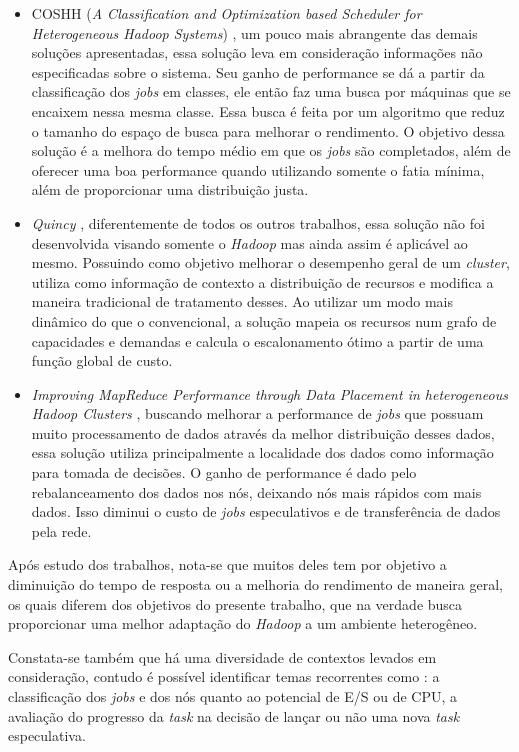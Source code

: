 \begin{itemize}
\item COSHH (\emph{A Classification and Optimization based Scheduler for Heterogeneous Hadoop Systems}) \cite{COSHH}, um pouco mais abrangente das demais soluções apresentadas, essa solução leva em consideração informações não especificadas sobre o sistema. Seu ganho de performance se dá a partir da classificação dos \emph{jobs} em classes, ele então faz uma busca por máquinas que se encaixem nessa mesma classe. Essa busca é feita por um algoritmo que reduz o tamanho do espaço de busca para melhorar o rendimento. O objetivo dessa solução é a melhora do tempo médio em que os \emph{jobs} são completados, além de oferecer uma boa performance quando utilizando somente o fatia mínima, além de proporcionar uma distribuição justa.

\item \emph{Quincy} \cite{Quincy}, diferentemente de todos os outros trabalhos, essa solução não foi desenvolvida visando somente o \emph{Hadoop} mas ainda assim é aplicável ao mesmo. Possuindo como objetivo melhorar o desempenho geral de um \emph{cluster}, utiliza como informação de contexto a distribuição de recursos e modifica a maneira tradicional de tratamento desses. Ao utilizar um modo mais dinâmico do que o convencional, a solução mapeia os recursos num grafo de capacidades e demandas e calcula o escalonamento ótimo a partir de uma função global de custo.

\item \emph{Improving MapReduce Performance through Data Placement in heterogeneous Hadoop Clusters} \cite{IMRPDPHHC}, buscando melhorar a performance de \emph{jobs} que possuam muito processamento de dados através da melhor distribuição desses dados, essa solução utiliza principalmente a localidade dos dados como informação para tomada de decisões. O ganho de performance é dado pelo rebalanceamento dos dados nos nós, deixando nós mais rápidos com mais dados. Isso diminui o custo de \emph{jobs} especulativos e de transferência de dados pela rede.
\end{itemize}

Após estudo dos trabalhos, nota-se que muitos deles tem por objetivo a diminuição do tempo de resposta ou a melhoria do rendimento de maneira geral, os quais diferem dos objetivos do presente trabalho, que na verdade busca proporcionar uma melhor adaptação do \emph{Hadoop} a um ambiente heterogêneo. 

Constata-se também que há uma diversidade de contextos levados em consideração, contudo é possível identificar temas recorrentes como : a classificação dos \emph{jobs} e dos nós quanto ao potencial de E/S ou de CPU, a avaliação do progresso da \emph{task} na decisão de lançar ou não uma nova \emph{task} especulativa.